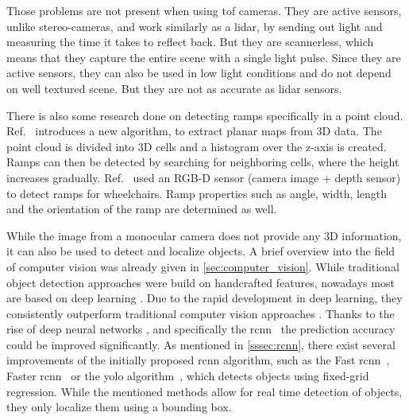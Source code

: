 Those problems are not present when using \gls{tof} cameras.
They are active sensors, unlike stereo-cameras, and work similarly as a \gls{lidar}, by sending out light and measuring the time it takes to reflect back.
But they are scannerless, which means that they capture the entire scene with a single light pulse.
Since they are active sensors, they can also be used in low light conditions and do not depend on well textured scene.
But they are not as accurate as \gls{lidar} sensors.

There is also some research done on detecting ramps specifically in a point cloud.
Ref.~\cite{Sakenas2007} introduces a new algorithm, to extract planar maps from 3D data.
The point cloud is divided into 3D cells and a histogram over the z-axis is created.
Ramps can then be detected by searching for neighboring cells, where the height increases gradually.
Ref.~\cite{Nejati2016} used an RGB-D sensor (camera image + depth sensor) to detect ramps for wheelchairs.
Ramp properties such as angle, width, length and the orientation of the ramp are determined as well.

While the image from a monocular camera does not provide any 3D information, it can also be used to detect and localize objects.
A brief overview into the field of computer vision was already given in \cref{sec:computer_vision}.
While traditional object detection approaches were build on handcrafted features, nowadays most are based on deep learning \cite{Zhao2019}.
Due to the rapid development in deep learning, they consistently outperform traditional computer vision approaches \cite{Mahony2019}.
Thanks to the rise of deep neural networks \cite{Krizhevsky2017}, and specifically the \gls{rcnn}~\cite{Girshick2014} the prediction accuracy could be improved significantly.
As mentioned in \cref{sssec:rcnn}, there exist several improvements of the initially proposed \gls{rcnn} algorithm, such as the Fast \gls{rcnn}~\cite{Girshick2015}, Faster \gls{rcnn}~\cite{Ren2017} or the \gls{yolo} algorithm~\cite{Redmon2016}, which detects objects using fixed-grid regression.
While the mentioned methods allow for real time detection of objects, they only localize them using a bounding box.

